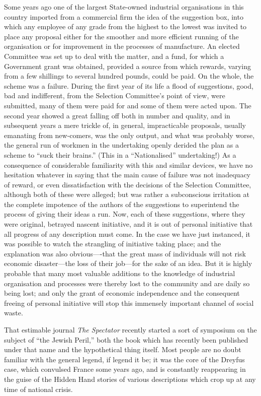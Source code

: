 \documentclass{book}
\begin{document}
Some years ago one of the largest State-owned industrial organisations in this country imported from a commercial firm the idea of the suggestion box, into which any employee of any grade from the highest to the lowest was invited to place any proposal either for the smoother and more efficient running of the organisation or for improvement in the processes of manufacture. An elected Committee was set up to deal with the matter, and a fund, for which a Government grant was obtained, provided a source from which rewards, varying from a few shillings to several hundred pounds, could be paid. On the whole, the scheme was a failure. During the first year of its life a flood of suggestions, good, bad and indifferent, from the Selection Committee’s point of view, were submitted, many of them were paid for and some of them were acted upon. The second year showed a great falling off both in number and quality, and in subsequent years a mere trickle of, in general, impracticable proposals, usually emanating from new-comers, was the only output, and what was probably worse, the general run of workmen in the undertaking openly derided the plan as a scheme to “suck their brains.” (This in a “Nationalised” undertaking!) As a consequence of considerable familiarity with this and similar devices, we have no hesitation whatever in saying that the main cause of failure was not inadequacy of reward, or even dissatisfaction with the decisions of the Selection Committee, although both of these were alleged; but was rather a subconscious irritation at the complete impotence of the authors of the suggestions to superintend the process of giving their ideas a run. Now, each of these suggestions, where they were original, betrayed nascent initiative, and it is out of personal initiative that all progress of any description must come. In the case we have just instanced, it was possible to watch the strangling of initiative taking place; and the explanation was also obvious—-that the great mass of individuals will not risk economic disaster—the loss of their job—for the sake of an idea. But it is highly probable that many most valuable additions to the knowledge of industrial organisation and processes were thereby lost to the community and are daily so being lost; and only the grant of economic independence and the consequent freeing of personal initiative will stop this immensely important channel of social waste.

That estimable journal \emph{The Spectator} recently started a sort of symposium on the subject of “the Jewish Peril,” both the book which has recently been published under that name and the hypothetical thing itself. Most people are no doubt familiar with the general legend, if legend it be; it was the core of the Dreyfus case, which convulsed France some years ago, and is constantly reappearing in the guise of the Hidden Hand stories of various descriptions which crop up at any time of national crisis.
\end{document}
